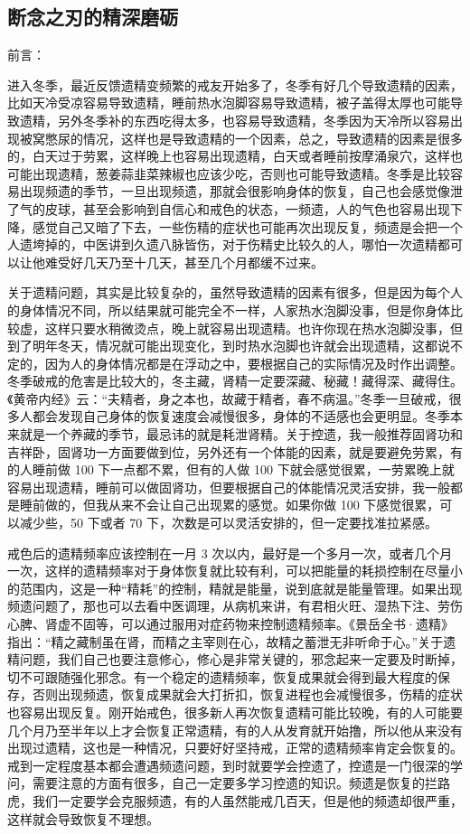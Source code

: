 \subsection{断念之刃的精深磨砺}

前言：

进入冬季，最近反馈遗精变频繁的戒友开始多了，冬季有好几个导致遗精的因素，比如天冷受凉容易导致遗精，睡前热水泡脚容易导致遗精，被子盖得太厚也可能导致遗精，另外冬季补的东西吃得太多，也容易导致遗精，冬季因为天冷所以容易出现被窝憋尿的情况，这样也是导致遗精的一个因素，总之，导致遗精的因素是很多的，白天过于劳累，这样晚上也容易出现遗精，白天或者睡前按摩涌泉穴，这样也可能出现遗精，葱姜蒜韭菜辣椒也应该少吃，否则也可能导致遗精。冬季是比较容易出现频遗的季节，一旦出现频遗，那就会很影响身体的恢复，自己也会感觉像泄了气的皮球，甚至会影响到自信心和戒色的状态，一频遗，人的气色也容易出现下降，感觉自己又暗了下去，一些伤精的症状也可能再次出现反复，频遗是会把一个人遗垮掉的，中医讲到久遗八脉皆伤，对于伤精史比较久的人，哪怕一次遗精都可以让他难受好几天乃至十几天，甚至几个月都缓不过来。

关于遗精问题，其实是比较复杂的，虽然导致遗精的因素有很多，但是因为每个人的身体情况不同，所以结果就可能完全不一样，人家热水泡脚没事，但是你身体比较虚，这样只要水稍微烫点，晚上就容易出现遗精。也许你现在热水泡脚没事，但到了明年冬天，情况就可能出现变化，到时热水泡脚也许就会出现遗精，这都说不定的，因为人的身体情况都是在浮动之中，要根据自己的实际情况及时作出调整。冬季破戒的危害是比较大的，冬主藏，肾精一定要深藏、秘藏！藏得深、藏得住。《黄帝内经》云：“夫精者，身之本也，故藏于精者，春不病温。”冬季一旦破戒，很多人都会发现自己身体的恢复速度会减慢很多，身体的不适感也会更明显。冬季本来就是一个养藏的季节，最忌讳的就是耗泄肾精。关于控遗，我一般推荐固肾功和吉祥卧，固肾功一方面要做到位，另外还有一个体能的因素，就是要避免劳累，有的人睡前做 100 下一点都不累，但有的人做 100 下就会感觉很累，一劳累晚上就容易出现遗精，睡前可以做固肾功，但要根据自己的体能情况灵活安排，我一般都是睡前做的，但我从来不会让自己出现累的感觉。如果你做 100 下感觉很累，可以减少些，50 下或者 70 下，次数是可以灵活安排的，但一定要找准拉紧感。

戒色后的遗精频率应该控制在一月 3 次以内，最好是一个多月一次，或者几个月一次，这样的遗精频率对于身体恢复就比较有利，可以把能量的耗损控制在尽量小的范围内，这是一种“精耗”的控制，精就是能量，说到底就是能量管理。如果出现频遗问题了，那也可以去看中医调理，从病机来讲，有君相火旺、湿热下注、劳伤心脾、肾虚不固等，可以通过服用对症药物来控制遗精频率。《景岳全书·遗精》指出：“精之藏制虽在肾，而精之主宰则在心，故精之蓄泄无非听命于心。”关于遗精问题，我们自己也要注意修心，修心是非常关键的，邪念起来一定要及时断掉，切不可跟随强化邪念。有一个稳定的遗精频率，恢复成果就会得到最大程度的保存，否则出现频遗，恢复成果就会大打折扣，恢复进程也会减慢很多，伤精的症状也容易出现反复。刚开始戒色，很多新人再次恢复遗精可能比较晚，有的人可能要几个月乃至半年以上才会恢复正常遗精，有的人从发育就开始撸，所以他从来没有出现过遗精，这也是一种情况，只要好好坚持戒，正常的遗精频率肯定会恢复的。戒到一定程度基本都会遭遇频遗问题，到时就要学会控遗了，控遗是一门很深的学问，需要注意的方面有很多，自己一定要多学习控遗的知识。频遗是恢复的拦路虎，我们一定要学会克服频遗，有的人虽然能戒几百天，但是他的频遗却很严重，这样就会导致恢复不理想。

